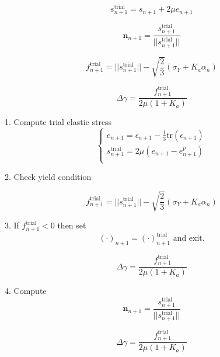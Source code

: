\documentclass[conference, onecolumn]{IEEEtran}
\begin{document}
\begin {equation}
s_{n+1}^{\text{trial}} = s_{n+1} + 2 \mu e_{n+1}
\end {equation}

\begin {equation}
\mathbf{n}_{n+1} = \frac{s_{n+1}^{\text{trial}}}{|| s_{n+1}^{\text{trial}} ||}
\end {equation}

\begin {equation}
f_{n+1}^{\text{trial}} = || s_{n+1}^{\text{trial}} || - \sqrt{\frac{2}{3}} (\sigma_{Y} + K_{a} \alpha_{n} )
\end {equation}

\begin {equation}
\Delta \gamma = \frac{f_{n+1}^{\text{trial}}}{2\mu(1+K_{a})}
\end {equation}

1. Compute trial elastic stress
\begin {equation}
\left\{
\begin{array}{ll}
e_{n+1} = \epsilon_{n+1} - \frac{1}{3} \text{tr}( \epsilon_{n+1} ) \\[5pt]
s_{n+1}^{\text{trial}} = 2\mu( e_{n+1} - e_{n+1}^{p} ) \\[5pt]
\end{array}
\right.
\end {equation}

2. Check yield condition

\begin {equation}
f_{n+1}^{\text{trial}} = || s_{n+1}^{\text{trial}} || - \sqrt{\frac{2}{3}} (\sigma_{Y} + K_{a} \alpha_{n} )
\end {equation}

3. If $f_{n+1}^{\text{trial}} < 0$ then set
\begin {equation}
(\cdot)_{n+1} = (\cdot)_{n+1}^{\text{trial}} \text{ and exit.}
\end {equation}

\begin {equation}
\Delta \gamma = \frac{f_{n+1}^{\text{trial}}}{2\mu(1+K_{a})}
\end {equation}

4. Compute
\begin {equation}
\mathbf{n}_{n+1} = \frac{s_{n+1}^{\text{trial}}}{|| s_{n+1}^{\text{trial}} ||}
\end {equation}

\begin {equation}
\Delta \gamma = \frac{f_{n+1}^{\text{trial}}}{2\mu(1+K_{a})}
\end {equation}
\end{document}
